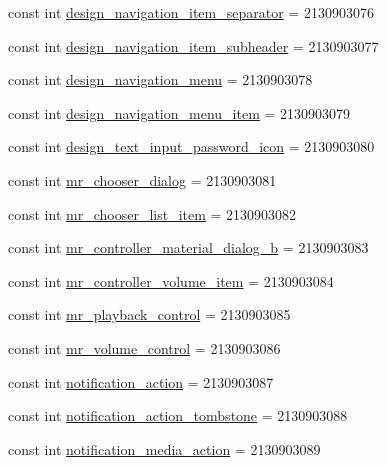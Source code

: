\begin{CompactItemize}
const int \hyperlink{class__2doo_1_1_droid_1_1_resource_1_1_layout_f70026a922e4930195fa1cfd389be6f6}{design\_\-navigation\_\-item\_\-separator} = 2130903076
\item 
const int \hyperlink{class__2doo_1_1_droid_1_1_resource_1_1_layout_7b623d23631daad6c4b633210f525f0a}{design\_\-navigation\_\-item\_\-subheader} = 2130903077
\item 
const int \hyperlink{class__2doo_1_1_droid_1_1_resource_1_1_layout_3825642a42548e95d51708316c3c4ab2}{design\_\-navigation\_\-menu} = 2130903078
\item 
const int \hyperlink{class__2doo_1_1_droid_1_1_resource_1_1_layout_99698a26e824aab13d4cfcc72eab072c}{design\_\-navigation\_\-menu\_\-item} = 2130903079
\item 
const int \hyperlink{class__2doo_1_1_droid_1_1_resource_1_1_layout_b539426a7c380f40ffd753c3cbd18f45}{design\_\-text\_\-input\_\-password\_\-icon} = 2130903080
\item 
const int \hyperlink{class__2doo_1_1_droid_1_1_resource_1_1_layout_33e11b793691a2fe574d79e677eee026}{mr\_\-chooser\_\-dialog} = 2130903081
\item 
const int \hyperlink{class__2doo_1_1_droid_1_1_resource_1_1_layout_c55079ff345e2478140f7b3b98430310}{mr\_\-chooser\_\-list\_\-item} = 2130903082
\item 
const int \hyperlink{class__2doo_1_1_droid_1_1_resource_1_1_layout_ec9561fe94c70cb50e47429e3fc7a1d5}{mr\_\-controller\_\-material\_\-dialog\_\-b} = 2130903083
\item 
const int \hyperlink{class__2doo_1_1_droid_1_1_resource_1_1_layout_9ba1ac0809dc9f0af48d3d65c8b5f90a}{mr\_\-controller\_\-volume\_\-item} = 2130903084
\item 
const int \hyperlink{class__2doo_1_1_droid_1_1_resource_1_1_layout_459b93513aee29b8221c7c4b84080cdb}{mr\_\-playback\_\-control} = 2130903085
\item 
const int \hyperlink{class__2doo_1_1_droid_1_1_resource_1_1_layout_8882eb05207c17349a8b4ec983be989a}{mr\_\-volume\_\-control} = 2130903086
\item 
const int \hyperlink{class__2doo_1_1_droid_1_1_resource_1_1_layout_f29f711fc46738a8c451dffabb8e06e5}{notification\_\-action} = 2130903087
\item 
const int \hyperlink{class__2doo_1_1_droid_1_1_resource_1_1_layout_8e6d6a87de4d92b90232edf2fcaf4c80}{notification\_\-action\_\-tombstone} = 2130903088
\item 
const int \hyperlink{class__2doo_1_1_droid_1_1_resource_1_1_layout_b78ef7a0a6d8a3cedece1dc3cc373dde}{notification\_\-media\_\-action} = 2130903089

\end{CompactItemize}
